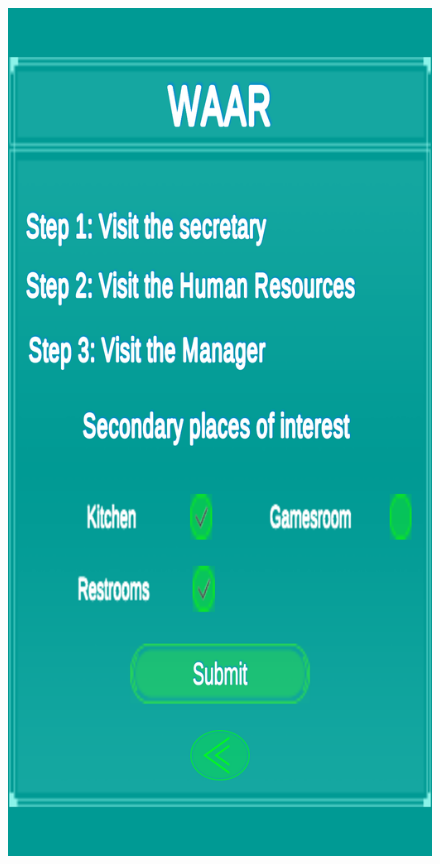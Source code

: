 \documentclass{aifyp}
\begin{document}
\begin{appendices}
\begin{figure}[H]
\begin{minipage}{.5\textwidth}
          \label{fig:VisitRecommendations}
        \end{minipage}
\end{figure}
\begin{figure}[H]
    \centering
        \begin{minipage}{.5\textwidth}
          \centering
          \includegraphics[scale=0.2]{Images/Chapter5/Impl12.png}

\end{minipage}
\end{figure}
\end{appendices}
\end{document}
